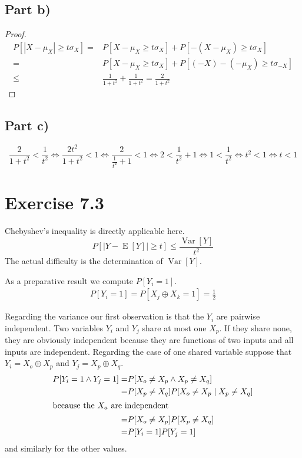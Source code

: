 \documentclass[10pt,a4paper]{article}
\DeclareMathOperator{\E}{E}
\DeclareMathOperator{\Var}{Var}
\begin{document}
\subsection*{Part b)}

\begin{proof}
  \begin{align*}
    P[|X - \mu_{X}| \ge t\sigma_{X}] = & P[X - \mu_{X} \ge t\sigma_{X}] + P[-(X - \mu_{X}) \ge t\sigma_{X}]\\
    = & P[X - \mu_{X} \ge t\sigma_{X}] + P[(-X) - (-\mu_{X}) \ge t\sigma_{-X}]\\
    \le & \frac{1}{1 + t^{2}} + \frac{1}{1 + t^{2}} = \frac{2}{1 + t^{2}}
  \end{align*}
\end{proof}

\subsection*{Part c)}

\begin{equation*}
  \frac{2}{1 + t^{2}} < \frac{1}{t^{2}} \Leftrightarrow \frac{2t^{2}}{1 + t^{2}} < 1 \Leftrightarrow \frac{2}{\frac{1}{t^{2}} + 1} < 1 \Leftrightarrow 2 < \frac{1}{t^{2}} + 1 \Leftrightarrow 1 < \frac{1}{t^{2}} \Leftrightarrow t^{2} < 1 \Leftrightarrow t < 1
\end{equation*}

\section*{Exercise 7.3}

Chebyshev's inequality is directly applicable here.
\begin{equation*}
  P\left[ |Y - \E[Y]| \ge t \right] \le \frac{\Var[Y]}{t^{2}}
\end{equation*}
The actual difficulty is the determination of $\Var[Y]$.

As a preparative result we compute $P[Y_{i} = 1]$.
\begin{align*}
  P[Y_{i} = 1] = P[X_{j} \oplus X_{k} = 1] = \frac{1}{2}
\end{align*}

Regarding the variance our first observation is that the $Y_{i}$ are pairwise independent.
Two variables $Y_{i}$ and $Y_{j}$ share at most one $X_{p}$.
If they share none, they are obviously independent because they are functions of two inputs and all inputs are independent.
Regarding the case of one shared variable suppose that $Y_{i} = X_{o} \oplus X_{p}$ and $Y_{j} = X_{p} \oplus X_{q}$.
\begin{align*}
  P[Y_{i} = 1 \land Y_{j} = 1] = & P[X_{o} \ne X_{p} \land X_{p} \ne X_{q}]\\
  = & P[X_{p} \ne X_{q}]P[X_{o} \ne X_{p} \mid X_{p} \ne X_{q}]\\
  \intertext{because the $X_{a}$ are independent}
  = & P[X_{o} \ne X_{p}]P[X_{p} \ne X_{q}]\\
  = & P[Y_{i} = 1]P[Y_{j} = 1]
\end{align*}
and similarly for the other values.
\end{document}
